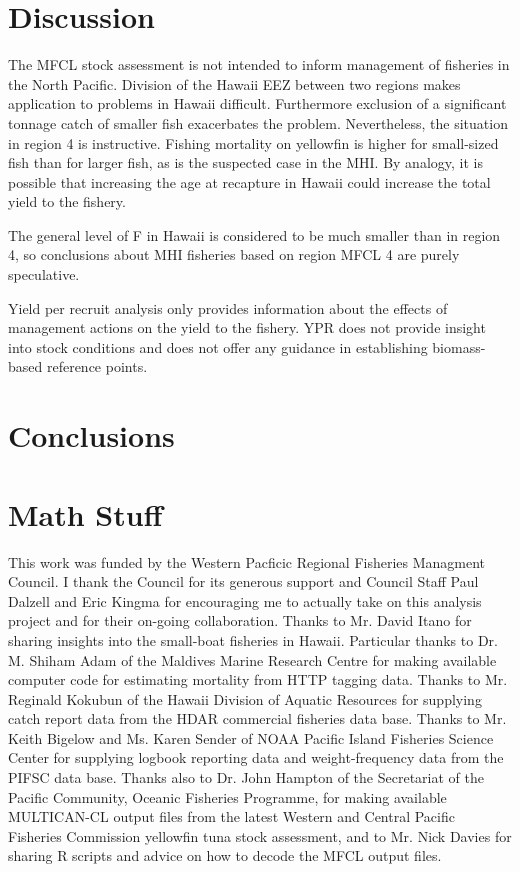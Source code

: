 \documentclass[12pt,letterpaper]{article}
\newcommand\singlespacing{\baselineskip=1.0\normalbaselineskip}
\newcommand\help[1]{\color{Magenta}{\it #1 }\normalcolor}
\begin{document}
\section*{Discussion}
The MFCL stock assessment is not intended to inform management of fisheries in
the North Pacific. Division of the Hawaii EEZ between two regions
makes application to problems in Hawaii difficult. Furthermore
exclusion of a significant tonnage catch of smaller fish exacerbates
the problem. Nevertheless, the situation in region 4 is instructive.
Fishing mortality on yellowfin is higher for small-sized fish than for
larger fish, as is the suspected case in the MHI. By analogy, it is
possible that increasing the age at recapture in Hawaii could increase
the total yield to the fishery. 


The general level of F in Hawaii is
considered to be much smaller than in region 4, so conclusions about
MHI fisheries based on region MFCL 4 are purely speculative.

Yield per recruit analysis only provides information about the effects
of management actions on the yield to the fishery. YPR does not
provide insight into stock conditions and does not offer any guidance
in establishing biomass-based reference points.

\help{Still working on it.}

\section*{Conclusions}\help{Working on it.}


\section*{Math Stuff}\help{Working on it.}

\singlespacing
\vspace{4ex}
This work was funded by the Western Pacficic Regional Fisheries
Managment Council. I thank the Council for its generous support and
Council Staff Paul Dalzell and Eric Kingma for encouraging me to
actually take on this analysis project and for their on-going
collaboration.
Thanks to Mr. David Itano for sharing insights into the small-boat
fisheries in Hawaii.
Particular thanks to Dr. M. Shiham Adam of the Maldives Marine
Research Centre for making available computer code for estimating
mortality from HTTP tagging data.
Thanks to Mr. Reginald Kokubun of the Hawaii Division of Aquatic
Resources for supplying catch report data from the HDAR commercial
fisheries data base.
Thanks to Mr. Keith Bigelow and Ms. Karen Sender of NOAA Pacific
Island Fisheries Science Center for supplying logbook reporting data and
weight-frequency data from the PIFSC data base.
Thanks also to Dr. John Hampton of the Secretariat of the Pacific
Community, Oceanic Fisheries Programme, for making available
MULTICAN-CL output files from the latest Western and Central Pacific
Fisheries Commission yellowfin tuna stock assessment, and to Mr. Nick
Davies for sharing R scripts and advice on how to decode the MFCL
output files.
\end{document}
